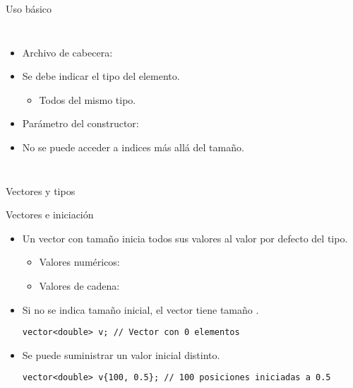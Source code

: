 \begin{frame}{Uso básico}
\begin{columns}[t]



\begin{itemize}
  \item Archivo de cabecera:
  \item Se debe indicar el tipo del elemento.
    \begin{itemize}
      \item Todos del mismo tipo.
    \end{itemize}
  \item Parámetro del constructor:
  \item No se puede acceder a indices más allá del tamaño.
\end{itemize}
\end{columns}
\end{frame}

\begin{frame}{Vectores y tipos}

\end{frame}


\begin{frame}[t,fragile]{Vectores e iniciación}
\begin{itemize}
  \item Un vector con tamaño inicia todos sus valores al valor por defecto del tipo.
    \begin{itemize}
      \item Valores numéricos: 
      \item Valores de cadena: 
    \end{itemize}
  \item Si no se indica tamaño inicial, el vector tiene tamaño .
\begin{lstlisting}
vector<double> v; // Vector con 0 elementos
\end{lstlisting}
  \item Se puede suministrar un valor inicial distinto.
\begin{lstlisting}
vector<double> v{100, 0.5}; // 100 posiciones iniciadas a 0.5
\end{lstlisting}
\end{itemize}
\end{frame}

